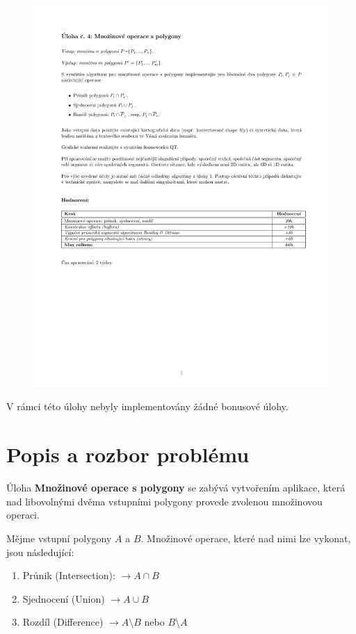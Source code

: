 \documentclass[a4paper, 12pt]{article}
\begin{document}
\begin{figure}[h!]
	\includegraphics[clip, trim=0cm 8.5cm 0cm 3cm, width=1.0\textwidth]{./pictures/zadani04.pdf}
\end{figure}

V rámci této úlohy nebyly implementovány žádné bonusové úlohy.
\clearpage

\section{Popis a rozbor problému}
Úloha \textbf{Množinové operace s polygony} se zabývá vytvořením aplikace, která nad libovolnými dvěma vstupními polygony provede zvolenou množinovou operaci. 

Mějme vstupní polygony $A$ a $B$. Množinové operace, které nad nimi lze vykonat, jsou následující:
\begin{enumerate}
\item Průnik (Intersection): $\longrightarrow A \cap B$
\item Sjednocení (Union) $\longrightarrow A \cup B$
\item Rozdíl (Difference) $\longrightarrow A$\textbackslash $B$ nebo $B$\textbackslash $A$
\end{enumerate}
\end{document}
